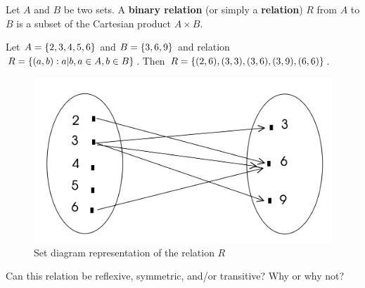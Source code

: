 \documentclass[10pt]{beamer}
\begin{document}
\begin{frame}
\footnotesize 
\begin{mygreenbox}[title=Definition]
Let $A$ and $B$ be two sets.  A \textbf{binary relation} (or simply a \textbf{relation}) $R$ from $A$ to $B$ is a subset of the Cartesian product $A \times B$.
\end{mygreenbox}

\begin{myredbox}[title=Example]
Let $A = \{ {2,3,4,5,6} \}$ and $B=\{ {3,6,9} \}$ and relation $R=\{ {(a,b): a|b, a \in A, b \in B} \}$.  Then  $R= \{ {(2,6), (3,3), (3,6), (3,9), (6,6)} \}$.

\begin{figure}
\includegraphics[width=.5\textwidth]{images/relation_example.png}	
\caption{Set diagram representation of the relation $R$}
\end{figure}

\end{myredbox}

\vfill 
\pause 
\begin{myyellowbox}[title=Poll]
Can this relation be reflexive, symmetric, and/or transitive? Why or why not?
\end{myyellowbox}

	
\end{frame}
\end{document}
